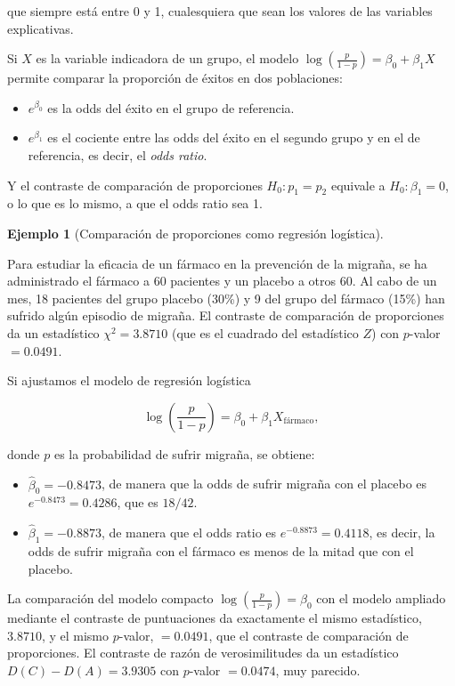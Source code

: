 \documentclass[
  spanish,
  a4paper,
]{scrreport}
\providecommand{\tightlist}{%
  \setlength{\itemsep}{0pt}\setlength{\parskip}{0pt}}
\theoremstyle{plain}
\theoremstyle{definition}
\newtheorem{example}{Ejemplo}[chapter]
\theoremstyle{definition}
\theoremstyle{remark}
\begin{document}
que siempre está entre 0 y 1, cualesquiera que sean los valores de las
variables explicativas.

Si \(X\) es la variable indicadora de un grupo, el modelo
\(\log\left(\frac{p}{1-p}\right) = \beta_0 + \beta_1X\) permite comparar
la proporción de éxitos en dos poblaciones:

\begin{itemize}
\tightlist
\item
  \(e^{\beta_0}\) es la odds del éxito en el grupo de referencia.
\item
  \(e^{\beta_1}\) es el cociente entre las odds del éxito en el segundo
  grupo y en el de referencia, es decir, el \emph{odds ratio}.
\end{itemize}

Y el contraste de comparación de proporciones \(H_0: p_1=p_2\) equivale
a \(H_0:\beta_1=0\), o lo que es lo mismo, a que el odds ratio sea 1.

\begin{example}[Comparación de proporciones como regresión
logística]\protect\hypertarget{exm-logistica-proporciones}{}\label{exm-logistica-proporciones}

Para estudiar la eficacia de un fármaco en la prevención de la migraña,
se ha administrado el fármaco a 60 pacientes y un placebo a otros 60. Al
cabo de un mes, 18 pacientes del grupo placebo (30\%) y 9 del grupo del
fármaco (15\%) han sufrido algún episodio de migraña. El contraste de
comparación de proporciones da un estadístico \(\chi^2=3.8710\) (que es
el cuadrado del estadístico \(Z\)) con \(p\)-valor \(= 0.0491\).

Si ajustamos el modelo de regresión logística

\[
\log\left(\frac{p}{1-p}\right) = \beta_0 + \beta_1X_{\text{fármaco}},
\]

donde \(p\) es la probabilidad de sufrir migraña, se obtiene:

\begin{itemize}
\tightlist
\item
  \(\hat\beta_0=-0.8473\), de manera que la odds de sufrir migraña con
  el placebo es \(e^{-0.8473}=0.4286\), que es \(18/42\).
\item
  \(\hat\beta_1=-0.8873\), de manera que el odds ratio es
  \(e^{-0.8873}=0.4118\), es decir, la odds de sufrir migraña con el
  fármaco es menos de la mitad que con el placebo.
\end{itemize}

La comparación del modelo compacto
\(\log\left(\frac{p}{1-p}\right) = \beta_0\) con el modelo ampliado
mediante el contraste de puntuaciones da exactamente el mismo
estadístico, \(3.8710\), y el mismo \(p\)-valor, \(= 0.0491\), que el
contraste de comparación de proporciones. El contraste de razón de
verosimilitudes da un estadístico \(D(C)-D(A)=3.9305\) con \(p\)-valor
\(= 0.0474\), muy parecido.

\end{example}
\end{document}

